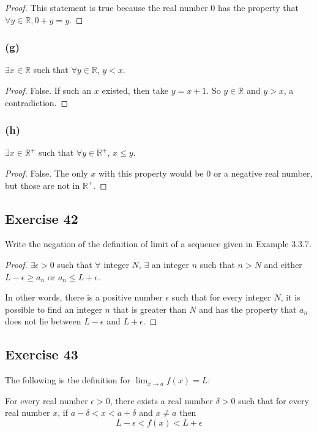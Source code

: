 \documentclass[14pt]{extarticle}
\newcommand{\R}{\mathbb{R}}
\newcommand{\fa}{\forall}
\newcommand{\te}{\exists}
\begin{document}
\begin{proof}
This statement is true because the real number 0 has the property that $\fa y \in \R, 0 + y = y$.
\end{proof}

\subsubsection{(g)}
$\te x \in \R$ such that $\fa y \in \R$, $y < x$.

\begin{proof}
False. If such an $x$ existed, then take $y = x+1$. So $y \in \R$ and $y > x$, a contradiction.
\end{proof}

\subsubsection{(h)}
$\te x \in \R^+$ such that $\fa y \in \R^+$, $x \leq y$.

\begin{proof}
False. The only $x$ with this property would be 0 or a negative real number, but those are not in $\R^+$.
\end{proof}

\subsection{Exercise 42}
Write the negation of the definition of limit of a sequence given in Example 3.3.7.

\begin{proof}
$\te \epsilon > 0$ such that $\fa$ integer $N$, $\te$ an integer $n$ such that $n > N$ and either $L - \epsilon \geq a_n$ or $a_n \leq L + \epsilon$. 

In other words, there is a positive number $\epsilon$ such that for every integer $N$, it is possible to find an integer $n$ that is greater than $N$ and has the property that $a_n$ does not lie between $L - \epsilon$ and $L + \epsilon$.
\end{proof}

\subsection{Exercise 43}
The following is the definition for $\lim_{x \to a} f(x) = L$:

For every real number $\epsilon > 0$, there exists a real number $\delta > 0$ such that for every real number $x$, if $a - \delta < x < a + \delta$ and $x \neq a$ then 
$$
L - \epsilon < f(x) < L + \epsilon
$$
\end{document}
